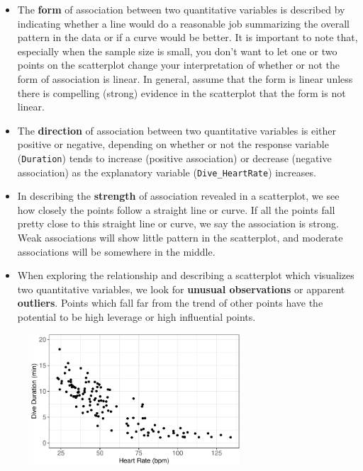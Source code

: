 \documentclass[
  letterpaper,
  DIV=11,
  numbers=noendperiod]{scrartcl}
\begin{document}
\begin{itemize}
\item
  The \textbf{form} of association between two quantitative variables is
  described by indicating whether a line would do a reasonable job
  summarizing the overall pattern in the data or if a curve would be
  better. It is important to note that, especially when the sample size
  is small, you don't want to let one or two points on the scatterplot
  change your interpretation of whether or not the form of association
  is linear. In general, assume that the form is linear unless there is
  compelling (strong) evidence in the scatterplot that the form is not
  linear.
\item
  The \textbf{direction} of association between two quantitative
  variables is either positive or negative, depending on whether or not
  the response variable (\texttt{Duration}) tends to increase (positive
  association) or decrease (negative association) as the explanatory
  variable (\texttt{Dive\_HeartRate}) increases.
\item
  In describing the \textbf{strength} of association revealed in a
  scatterplot, we see how closely the points follow a straight line or
  curve. If all the points fall pretty close to this straight line or
  curve, we say the association is strong. Weak associations will show
  little pattern in the scatterplot, and moderate associations will be
  somewhere in the middle.
\item
  When exploring the relationship and describing a scatterplot which
  visualizes two quantitative variables, we look for \textbf{unusual
  observations} or apparent \textbf{outliers}. Points which fall far
  from the trend of other points have the potential to be high leverage
  or high influential points.
\end{itemize}

\begin{figure}

{\centering \includegraphics[width=0.7\textwidth,height=\textheight]{activity4-diving-penguins-key_files/figure-pdf/eda-1.pdf}

}

\end{figure}
\end{document}
